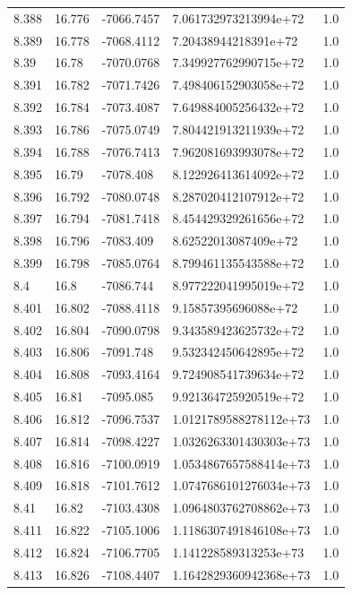 \begin{tabular}{lllll}
8.388 & 16.776 & -7066.7457 & 7.061732973213994e+72 & 1.0 \\
8.389 & 16.778 & -7068.4112 & 7.20438944218391e+72 & 1.0 \\
8.39 & 16.78 & -7070.0768 & 7.349927762990715e+72 & 1.0 \\
8.391 & 16.782 & -7071.7426 & 7.498406152903058e+72 & 1.0 \\
8.392 & 16.784 & -7073.4087 & 7.649884005256432e+72 & 1.0 \\
8.393 & 16.786 & -7075.0749 & 7.804421913211939e+72 & 1.0 \\
8.394 & 16.788 & -7076.7413 & 7.962081693993078e+72 & 1.0 \\
8.395 & 16.79 & -7078.408 & 8.122926413614092e+72 & 1.0 \\
8.396 & 16.792 & -7080.0748 & 8.287020412107912e+72 & 1.0 \\
8.397 & 16.794 & -7081.7418 & 8.454429329261656e+72 & 1.0 \\
8.398 & 16.796 & -7083.409 & 8.62522013087409e+72 & 1.0 \\
8.399 & 16.798 & -7085.0764 & 8.799461135543588e+72 & 1.0 \\
8.4 & 16.8 & -7086.744 & 8.977222041995019e+72 & 1.0 \\
8.401 & 16.802 & -7088.4118 & 9.15857395696088e+72 & 1.0 \\
8.402 & 16.804 & -7090.0798 & 9.343589423625732e+72 & 1.0 \\
8.403 & 16.806 & -7091.748 & 9.532342450642895e+72 & 1.0 \\
8.404 & 16.808 & -7093.4164 & 9.724908541739634e+72 & 1.0 \\
8.405 & 16.81 & -7095.085 & 9.921364725920519e+72 & 1.0 \\
8.406 & 16.812 & -7096.7537 & 1.0121789588278112e+73 & 1.0 \\
8.407 & 16.814 & -7098.4227 & 1.0326263301430303e+73 & 1.0 \\
8.408 & 16.816 & -7100.0919 & 1.0534867657588414e+73 & 1.0 \\
8.409 & 16.818 & -7101.7612 & 1.0747686101276034e+73 & 1.0 \\
8.41 & 16.82 & -7103.4308 & 1.0964803762708862e+73 & 1.0 \\
8.411 & 16.822 & -7105.1006 & 1.1186307491846108e+73 & 1.0 \\
8.412 & 16.824 & -7106.7705 & 1.141228589313253e+73 & 1.0 \\
8.413 & 16.826 & -7108.4407 & 1.1642829360942368e+73 & 1.0 \\

\end{tabular}
